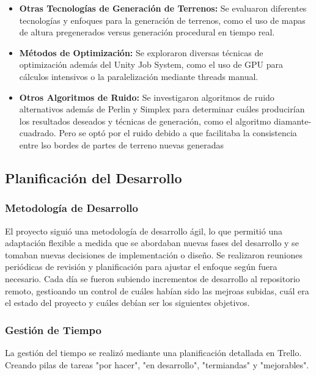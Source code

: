\begin{itemize}
    \item \textbf{Otras Tecnologías de Generación de Terrenos:} Se evaluaron diferentes tecnologías y enfoques para la generación de terrenos, como el uso de mapas de altura pregenerados versus generación procedural en tiempo real.
    
    \item \textbf{Métodos de Optimización:} Se exploraron diversas técnicas de optimización además del Unity Job System, como el uso de GPU para cálculos intensivos o la paralelización mediante threads manual.
    
    \item \textbf{Otros Algoritmos de Ruido:} Se investigaron algoritmos de ruido alternativos además de Perlin y Simplex para determinar cuáles producirían los resultados deseados y técnicas de generación, como el algoritmo diamante-cuadrado. Pero se optó por el ruido debido a que facilitaba la consistencia entre lso bordes de partes de terreno nuevas generadas
\end{itemize}

\subsection{Planificación del Desarrollo}

\subsubsection{Metodología de Desarrollo}
El proyecto siguió una metodología de desarrollo ágil, lo que permitió una adaptación flexible a medida que se abordaban nuevas fases del desarrollo y se tomaban nuevas decisiones de implementación o diseño. Se realizaron reuniones periódicas de revisión y planificación para ajustar el enfoque según fuera necesario. Cada día se fueron subiendo incrementos de desarrollo al repositorio remoto, gestioando un control de cuáles habían sido las mejroas subidas, cuál era el estado del proyecto y cuáles debían ser los siguientes objetivos.

\subsubsection{Gestión de Tiempo}
La gestión del tiempo se realizó mediante una planificación detallada en Trello. Creando pilas de tareas "por hacer", "en desarrollo", "termiandas" y "mejorables".


